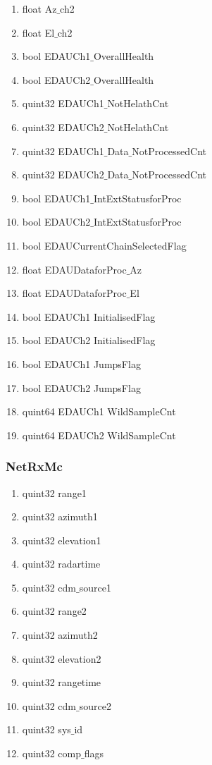 \begin{enumerate}
\begin{enumerate}
	\item float Az$\_$ch2
	\item float El$\_$ch2
	\item bool EDAUCh1$\_$OverallHealth
	\item bool EDAUCh2$\_$OverallHealth
	\item quint32 EDAUCh1$\_$NotHelathCnt
	\item quint32 EDAUCh2$\_$NotHelathCnt
	\item quint32 EDAUCh1$\_$Data$\_$NotProcessedCnt
	\item quint32 EDAUCh2$\_$Data$\_$NotProcessedCnt
	\item bool EDAUCh1$\_$IntExtStatusforProc
	\item bool EDAUCh2$\_$IntExtStatusforProc
	\item bool EDAUCurrentChainSelectedFlag
	\item float EDAUDataforProc$\_$Az
	\item float EDAUDataforProc$\_$El
	\item bool EDAUCh1 InitialisedFlag
	\item bool EDAUCh2 InitialisedFlag
	\item bool EDAUCh1 JumpsFlag
	\item bool EDAUCh2 JumpsFlag
	\item quint64 EDAUCh1 WildSampleCnt
	\item quint64 EDAUCh2 WildSampleCnt
\end{enumerate}

\subsubsection{NetRxMc}
\begin{enumerate}
	\item quint32 range1
	\item quint32   azimuth1
	\item quint32 elevation1 
	\item quint32 radartime
	\item quint32 cdm$\_$source1
	\item quint32 range2 
	\item quint32 azimuth2
	\item quint32 elevation2 
	\item quint32 rangetime
	\item quint32 cdm$\_$source2 
	\item quint32 sys$\_$id
	\item quint32 comp$\_$flags
\end{enumerate}


\end{enumerate}
